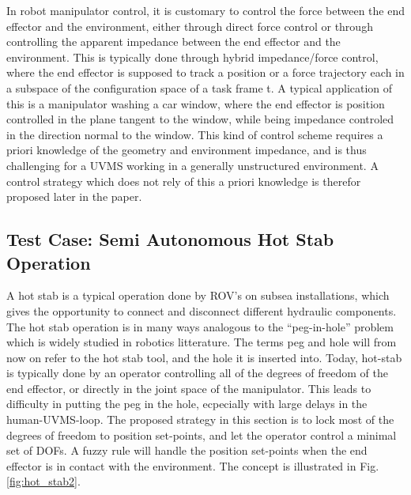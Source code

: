In robot manipulator control, it is customary to control the force between the end effector and the environment, either through direct force control or through controlling the apparent impedance between the end effector and the environment. This is typically done through hybrid impedance/force control, where the end effector is supposed to track a position or a force trajectory each in a subspace of the configuration space of a task frame \frame t. 
A typical application of this is a manipulator washing a car window, where the end effector is position controlled in the plane tangent to the window, while being impedance controled in the direction normal to the window. 
This kind of control scheme requires a priori knowledge of the geometry and environment impedance, and is thus challenging for a UVMS working in a generally unstructured environment. 
A control strategy which does not rely of this a priori knowledge is therefor proposed later in the paper.



























\subsection{Test Case: Semi Autonomous Hot Stab Operation}
A hot stab is a typical operation done by ROV's on subsea installations, which gives the opportunity to connect and disconnect different hydraulic components. 
The hot stab operation is in many ways analogous to the ``peg-in-hole'' problem which is widely studied in robotics litterature. The terms peg and hole will from now on refer to the hot stab tool, and the hole it is inserted into. 
Today, hot-stab is typically done by an operator controlling all of the degrees of freedom of the end effector, or directly in the joint space of the manipulator. This leads to difficulty in putting the peg in the hole, ecpecially 
with large delays in the human-UVMS-loop. 
The proposed strategy in this section is to lock most of the degrees of freedom to position set-points, and let the operator control a minimal set of DOFs. A fuzzy rule will handle the position set-points when the end effector is in 
contact with the environment. The concept is illustrated in Fig. \ref{fig:hot_stab2}.


